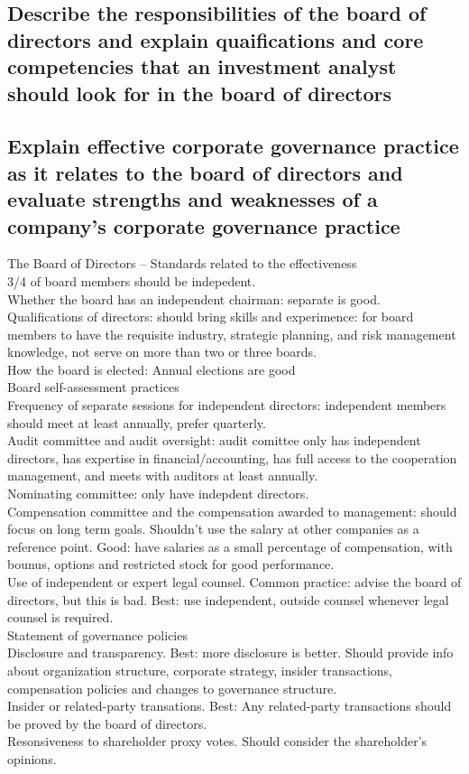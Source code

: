 \documentclass{article}
\begin{document}
\subsection{Describe the responsibilities of the board of directors and explain quaifications
and core competencies that an investment analyst should look for in the board of directors}
\subsection{Explain effective corporate governance practice as it relates to
the board of directors and evaluate strengths and weaknesses of a company's corporate governance
practice}
The Board of Directors -- Standards related to the effectiveness
\\3/4 of board members should be indepedent.
\\Whether the board has an independent chairman: separate is good.
\\Qualifications of directors: should bring skills and experimence: for
board members to have the requisite industry, strategic planning, and risk management
knowledge, not serve on more than two or three boards.
\\How the board is elected: Annual elections are good
\\Board self-assessment practices
\\Frequency of separate sessions for independent directors: independent members
should meet at least annually, prefer quarterly.
\\Audit committee and audit oversight: audit comittee only has independent directors,
has expertise in financial/accounting, has full access to the cooperation management, and meets
with auditors at least annually.
\\Nominating committee: only have indepdent directors.
\\Compensation committee and the compensation awarded to management: should focus on 
long term goals. Shouldn't use the salary at other companies as a reference point. 
Good: have salaries as a small percentage of compensation, with bounus, options
and restricted stock for good performance.
\\Use of independent or expert legal counsel. Common practice: advise the board
of directors, but this is bad. Best: use independent, outside counsel whenever
legal counsel is required.
\\Statement of governance policies
\\Disclosure and transparency. Best: more disclosure is better. Should provide info
about organization structure, corporate strategy, insider transactions, compensation policies
and changes to governance structure.
\\Insider or related-party transations. Best: Any related-party transactions should be
proved by the board of directors.
\\Resonsiveness to shareholder proxy votes.  Should consider the shareholder's opinions.
\end{document}
